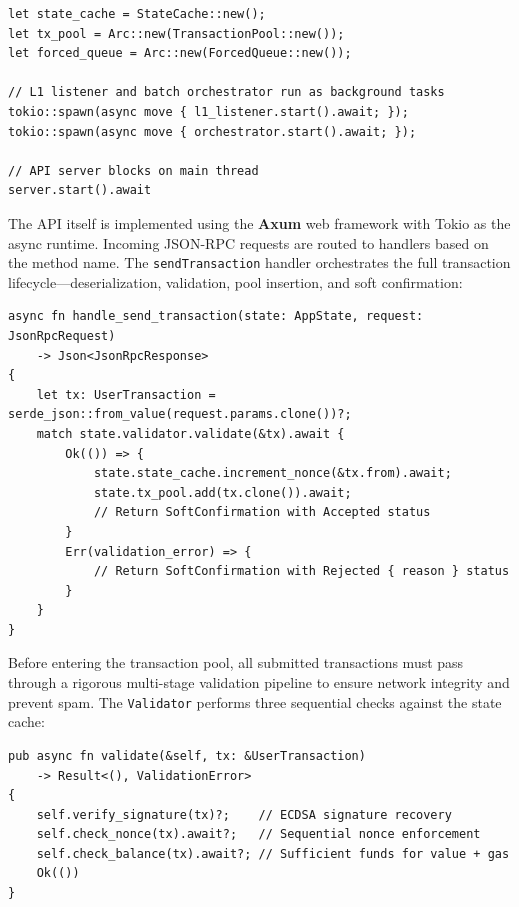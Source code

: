 \begin{lstlisting}[style=rustStyle, caption={Composition root wiring components}, label={lst:main}]
let state_cache = StateCache::new();
let tx_pool = Arc::new(TransactionPool::new());
let forced_queue = Arc::new(ForcedQueue::new());

// L1 listener and batch orchestrator run as background tasks
tokio::spawn(async move { l1_listener.start().await; });
tokio::spawn(async move { orchestrator.start().await; });

// API server blocks on main thread
server.start().await
\end{lstlisting}

The API itself is implemented using the \textbf{Axum} web framework with Tokio as the async runtime. Incoming JSON-RPC requests are routed to handlers based on the method name. The \texttt{sendTransaction} handler orchestrates the full transaction lifecycle---deserialization, validation, pool insertion, and soft confirmation:

\begin{lstlisting}[style=rustStyle, caption={Transaction submission handler}, label={lst:send-tx}]
async fn handle_send_transaction(state: AppState, request: JsonRpcRequest)
    -> Json<JsonRpcResponse>
{
    let tx: UserTransaction = serde_json::from_value(request.params.clone())?;
    match state.validator.validate(&tx).await {
        Ok(()) => {
            state.state_cache.increment_nonce(&tx.from).await;
            state.tx_pool.add(tx.clone()).await;
            // Return SoftConfirmation with Accepted status
        }
        Err(validation_error) => {
            // Return SoftConfirmation with Rejected { reason } status
        }
    }
}
\end{lstlisting}


Before entering the transaction pool, all submitted transactions must pass through a rigorous multi-stage validation pipeline to ensure network integrity and prevent spam. The \texttt{Validator} performs three sequential checks against the state cache:

\begin{lstlisting}[style=rustStyle, caption={Three-stage validation pipeline}, label={lst:validator}]
pub async fn validate(&self, tx: &UserTransaction)
    -> Result<(), ValidationError>
{
    self.verify_signature(tx)?;    // ECDSA signature recovery
    self.check_nonce(tx).await?;   // Sequential nonce enforcement
    self.check_balance(tx).await?; // Sufficient funds for value + gas
    Ok(())
}
\end{lstlisting}

